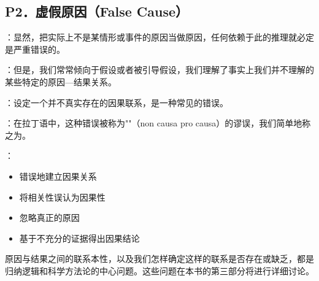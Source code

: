 \subsection{P2．虚假原因（False Cause）}

\begin{theorembox}[title=虚假原因谬误的定义与特征]
：显然，把实际上不是某情形或事件的原因当做原因，任何依赖于此的推理就必定是严重错误的。

：但是，我们常常倾向于假设或者被引导假设，我们理解了事实上我们并不理解的某些特定的原因—结果关系。

：设定一个并不真实存在的因果联系，是一种常见的错误。

：在拉丁语中，这种错误被称为""（non causa pro causa）的谬误，我们简单地称之为。

：
\begin{itemize}
  \item 错误地建立因果关系
  \item 将相关性误认为因果性
  \item 忽略真正的原因
  \item 基于不充分的证据得出因果结论
\end{itemize}
\end{theorembox}

\begin{logicbox}[title=因果关系研究的重要性]
原因与结果之间的联系本性，以及我们怎样确定这样的联系是否存在或缺乏，都是归纳逻辑和科学方法论的中心问题。这些问题在本书的第三部分将进行详细讨论。
\end{logicbox}

